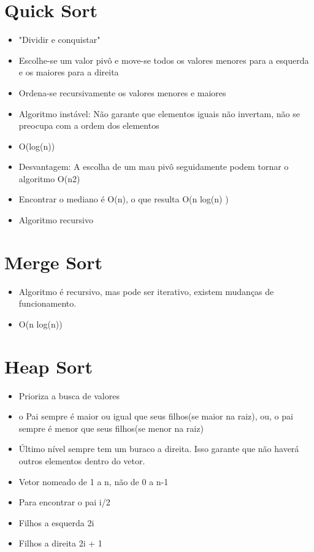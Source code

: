 \documentclass{article}
\begin{document}
\section{Quick Sort}
	\begin{itemize}
	\item "Dividir e conquistar"
	\item Escolhe-se um valor pivô e move-se todos os valores menores para a esquerda e os maiores para a direita
	\item Ordena-se recursivamente os valores menores e maiores
	\item Algoritmo instável: Não garante que elementos iguais não invertam, não se preocupa com a ordem dos elementos
	\item O(log(n))
	\item Desvantagem: A escolha de um mau pivô seguidamente podem tornar o algoritmo O(n2)
	\item Encontrar o mediano é O(n), o que resulta O(n log(n) ) 
	\item Algoritmo recursivo
	\end{itemize}

\section{Merge Sort}
	\begin{itemize}
	\item Algoritmo é recursivo, mas pode ser iterativo, existem mudanças de funcionamento.
	\item O(n log(n))
	\end{itemize}

\section{Heap Sort}
	\begin{itemize}
	\item Prioriza a busca de valores
	\item o Pai sempre é maior ou igual que seus filhos(se maior na raiz), ou, o pai sempre é menor que seus filhos(se menor na raiz)
	\item Último nível sempre tem um buraco a direita. Isso garante que não haverá outros elementos dentro do vetor.
	\item Vetor nomeado de 1 a n, não de 0 a n-1
	\item Para encontrar o pai i/2
	\item Filhos a esquerda 2i
	\item Filhos a direita 2i + 1		
	\end{itemize}
\end{document}
